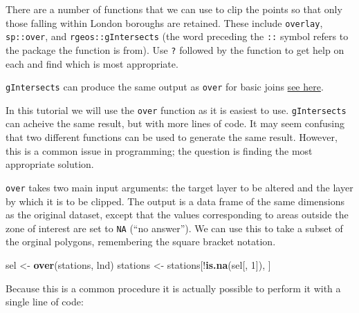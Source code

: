 \documentclass[]{article}
\newenvironment{Shaded}{}{}
\newcommand{\KeywordTok}[1]{\textcolor[rgb]{0.00,0.44,0.13}{\textbf{{#1}}}}
\newcommand{\DecValTok}[1]{\textcolor[rgb]{0.25,0.63,0.44}{{#1}}}
\newcommand{\NormalTok}[1]{{#1}}
\begin{document}
There are a number of functions that we can use to clip the points so
that only those falling within London boroughs are retained. These
include \texttt{overlay}, \texttt{sp::over}, and
\texttt{rgeos::gIntersects} (the word preceding the \texttt{::} symbol
refers to the package the function is from). Use \texttt{?} followed by
the function to get help on each and find which is most appropriate.

\texttt{gIntersects} can produce the same output as \texttt{over} for
basic joins
\href{http://gis.stackexchange.com/questions/63793/how-to-overlay-a-polygon-over-spatialpointsdataframe-and-preserving-the-spdf-dat}{see
here}.

In this tutorial we will use the \texttt{over} function as it is easiest
to use. \texttt{gIntersects} can acheive the same result, but with more
lines of code. It may seem confusing that two different functions can be
used to generate the same result. However, this is a common issue in
programming; the question is finding the most appropriate solution.

\texttt{over} takes two main input arguments: the target layer to be
altered and the layer by which it is to be clipped. The output is a data
frame of the same dimensions as the original dataset, except that the
values corresponding to areas outside the zone of interest are set to
\texttt{NA} (``no answer''). We can use this to take a subset of the
orginal polygons, remembering the square bracket notation.

\begin{Shaded}
\begin{Highlighting}[]
\NormalTok{sel <- }\KeywordTok{over}\NormalTok{(stations, lnd)}
\NormalTok{stations <- stations[!}\KeywordTok{is.na}\NormalTok{(sel[, }\DecValTok{1}\NormalTok{]), ]}
\end{Highlighting}
\end{Shaded}
Because this is a common procedure it is actually possible to perform it
with a single line of code:
\end{document}
